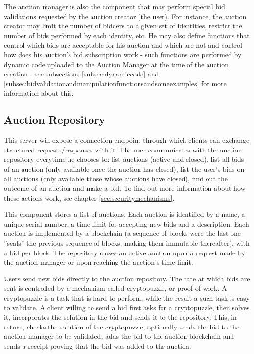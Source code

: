 \documentclass[a4paper]{article}
\begin{document}
The auction manager is also the component that may perform special bid validations requested by the auction creator (the user). 
For instance, the auction creator may limit the number of bidders to a given set of identities, restrict the number of bids performed by each identity, etc. 
He may also define functions that control which bids are acceptable for his auction and which are not and control how does his auction's bid subscription work - such functions are performed by dynamic code uploaded to the Auction Manager at the time of the auction creation - see subsections \ref{subsec:dynamiccode} and \ref{subsec:bidvalidationandmanipulationfunctionsandsomeexamples} for more information about this.

\subsection{Auction Repository}

This server will expose a connection endpoint through which clients can exchange structured requests/responses with it. 
The user communicates with the auction repository everytime he chooses to: list auctions (active and closed), list all bids of an auction (only available once the auction has closed), list the user's bids on all auctions (only available those whose auctions have closed), find out the outcome of an auction and make a bid. 
To find out more information about how these actions work, see chapter \ref{sec:securitymechanisms}.

This component stores a list of auctions. 
Each auction is identified by a name, a unique serial number, a time limit for accepting new bids and a description. 
Each auction is implemented by a blockchain (a sequence of blocks were the last one ”seals” the previous sequence of blocks, making them immutable thereafter), with a bid per block. 
The repository closes an active auction upon a request made by the auction manager or upon reaching the auction’s time limit.

Users send new bids directly to the auction repository. 
The rate at which bids are sent is controlled by a mechanism called cryptopuzzle, or proof-of-work. 
A cryptopuzzle is a task that is hard to perform, while the result a such task is easy to validate. 
A client willing to send a bid first asks for a cryptopuzzle, then solves it, incorporates the solution in the bid and sends it to the repository. 
This, in return, checks the solution of the cryptopuzzle, optionally sends the bid to the auction manager to be validated, adds the bid to the auction blockchain and sends a receipt proving that the bid was added to the auction.
\end{document}

